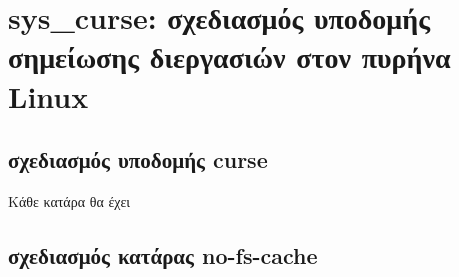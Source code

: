 \documentclass[a4paper,10pt]{article} \usepackage{anysize}
\begin{document}
\renewcommand{\theenumi}{\roman{enumi}}


\section*{sys_curse: σχεδιασμός υποδομής σημείωσης διεργασιών στον πυρήνα
Linux}
\subsection*{σχεδιασμός υποδομής curse}
Κάθε κατάρα θα έχει 
\subsection*{σχεδιασμός κατάρας no-fs-cache}
\end{document}
